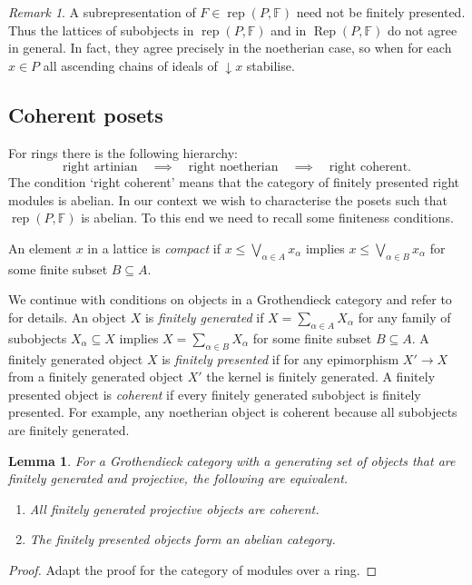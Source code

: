 \documentclass[a4paper]{amsart}
\theoremstyle{plain}
\newtheorem{lem}[thm]{Lemma}
\theoremstyle{definition}
\theoremstyle{remark}
\newtheorem{rem}[thm]{Remark}
\numberwithin{equation}{section}
\newcommand{\rep}{\operatorname{rep}}
\newcommand{\Rep}{\operatorname{Rep}}
\def\bbF{\mathbb F}
\begin{document}
\begin{rem}
  A subrepresentation of $F\in\rep(P,\bbF)$ need not be finitely
  presented. Thus the lattices of subobjects in $\rep(P,\bbF)$ and in
  $\Rep(P,\bbF)$ do not agree in general. In fact, they agree
  precisely in the noetherian case, so when for each $x\in P$ all ascending
  chains of ideals of $\downarrow\! x$ stabilise.
\end{rem}


\subsection*{Coherent posets}
For rings there is the following hierarchy:
\[\text{right artinian}\quad\implies\quad \text{right
    noetherian}\quad\implies\quad\text{right coherent}.\] The
condition `right coherent' means that the category of finitely
presented right modules is abelian. In our context we wish to characterise
the posets such that $\rep(P,\bbF)$ is abelian. To this end we need to
recall some finiteness conditions.

An element $x$ in a lattice is \emph{compact}
if $x\le \bigvee_{\alpha\in A} x_\alpha$ implies $x\le \bigvee_{\alpha\in B} x_\alpha$ for
some finite subset $B\subseteq A$.

We continue with conditions on objects in a Grothendieck category and
refer to \cite{St1975} for details. An object $X$ is \emph{finitely
  generated} if $X=\sum_{\alpha\in A} X_\alpha$ for any family of subobjects
$X_\alpha\subseteq X$ implies $X=\sum_{\alpha\in B} X_\alpha$ for some finite
subset $B\subseteq A$. A finitely generated object $X$ is
\emph{finitely presented} if for any epimorphism $X'\to X$ from a
finitely generated object $X'$ the kernel is finitely generated. A
finitely presented object is \emph{coherent} if every finitely
generated subobject is finitely presented. For example, any noetherian
object is coherent because all subobjects are finitely generated.

\begin{lem}\label{le:mod-coherent}
 For a Grothendieck category with a generating set of objects that are
  finitely generated and projective, the following  are equivalent.
  \begin{enumerate}
\item All finitely generated projective objects are coherent.
\item The finitely presented objects form an abelian category.
 \end{enumerate}
\end{lem}
\begin{proof}
  Adapt the proof for the category of modules over a ring.
\end{proof}
\end{document}
